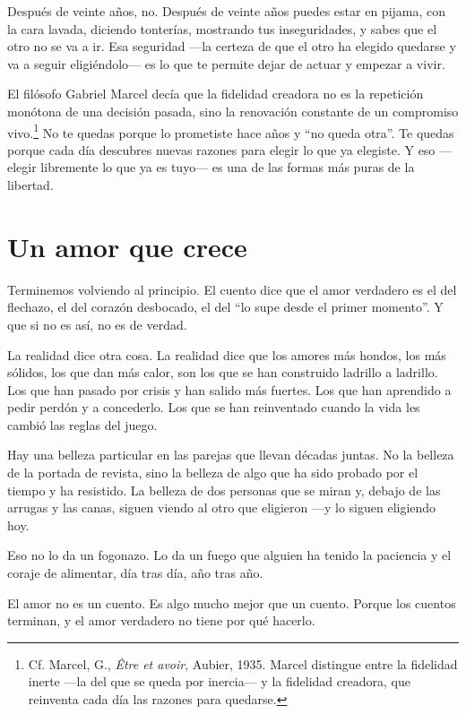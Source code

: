 Después de veinte años, no. Después de veinte años puedes estar en pijama, con la cara lavada, diciendo tonterías, mostrando tus inseguridades, y sabes que el otro no se va a ir. Esa seguridad ---la certeza de que el otro ha elegido quedarse y va a seguir eligiéndolo--- es lo que te permite dejar de actuar y empezar a vivir.

El filósofo Gabriel Marcel decía que la fidelidad creadora no es la repetición monótona de una decisión pasada, sino la renovación constante de un compromiso vivo.\footnote{Cf. Marcel, G., \textit{Être et avoir}, Aubier, 1935. Marcel distingue entre la fidelidad inerte ---la del que se queda por inercia--- y la fidelidad creadora, que reinventa cada día las razones para quedarse.} No te quedas porque lo prometiste hace años y ``no queda otra''. Te quedas porque cada día descubres nuevas razones para elegir lo que ya elegiste. Y eso ---elegir libremente lo que ya es tuyo--- es una de las formas más puras de la libertad.

\section{Un amor que crece}

Terminemos volviendo al principio. El cuento dice que el amor verdadero es el del flechazo, el del corazón desbocado, el del ``lo supe desde el primer momento''. Y que si no es así, no es de verdad.

La realidad dice otra cosa. La realidad dice que los amores más hondos, los más sólidos, los que dan más calor, son los que se han construido ladrillo a ladrillo. Los que han pasado por crisis y han salido más fuertes. Los que han aprendido a pedir perdón y a concederlo. Los que se han reinventado cuando la vida les cambió las reglas del juego.

Hay una belleza particular en las parejas que llevan décadas juntas. No la belleza de la portada de revista, sino la belleza de algo que ha sido probado por el tiempo y ha resistido. La belleza de dos personas que se miran y, debajo de las arrugas y las canas, siguen viendo al otro que eligieron ---y lo siguen eligiendo hoy.

Eso no lo da un fogonazo. Lo da un fuego que alguien ha tenido la paciencia y el coraje de alimentar, día tras día, año tras año.

El amor no es un cuento. Es algo mucho mejor que un cuento. Porque los cuentos terminan, y el amor verdadero no tiene por qué hacerlo.

